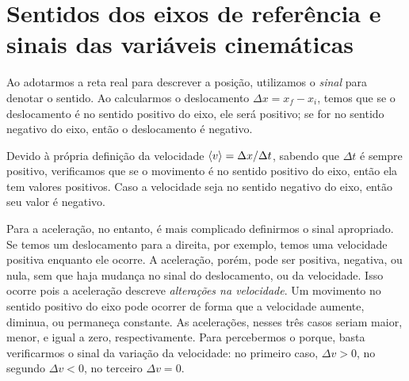 \section{Sentidos dos eixos de referência e sinais das variáveis cinemáticas}
\label{Sec:Sinais}

Ao adotarmos a reta real para descrever a posição, utilizamos o \emph{sinal} para denotar o sentido. Ao calcularmos o deslocamento $\Delta x = x_f - x_i$, temos que se o deslocamento é no sentido positivo do eixo, ele será positivo; se for no sentido negativo do eixo, então o deslocamento é negativo.

Devido à própria definição da velocidade $\left\langle{v}\right\rangle = \Delta x / \Delta t$, sabendo que $\Delta t$ é sempre positivo, verificamos que se o movimento é no sentido positivo do eixo, então ela tem valores positivos. Caso a velocidade seja no sentido negativo do eixo, então seu valor é negativo.

Para a aceleração, no entanto, é mais complicado definirmos o sinal apropriado. Se temos um deslocamento para a direita, por exemplo, temos uma velocidade positiva enquanto ele ocorre. A aceleração, porém, pode ser positiva, negativa, ou nula, sem que haja mudança no sinal do deslocamento, ou da velocidade. Isso ocorre pois a aceleração descreve \emph{alterações na velocidade}. Um movimento no sentido positivo do eixo pode ocorrer de forma que a velocidade aumente, diminua, ou permaneça constante. As acelerações, nesses três casos seriam maior, menor, e igual a zero, respectivamente. Para percebermos o porque, basta verificarmos o sinal da variação da velocidade: no primeiro caso, $\Delta v > 0$, no segundo $\Delta v < 0$, no terceiro $\Delta v = 0$.

